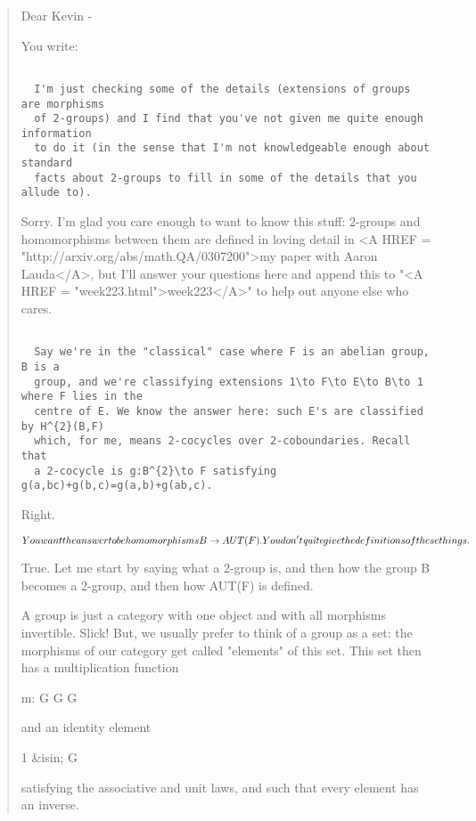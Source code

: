 \begin{quote}
Dear Kevin -

You write:


\begin{verbatim}

  I'm just checking some of the details (extensions of groups are morphisms 
  of 2-groups) and I find that you've not given me quite enough information 
  to do it (in the sense that I'm not knowledgeable enough about standard 
  facts about 2-groups to fill in some of the details that you allude to).
\end{verbatim}
    
 
Sorry.   I'm glad you care enough to want to know this stuff:
2-groups and homomorphisms between them are defined in loving detail 
in 
<A HREF = "http://arxiv.org/abs/math.QA/0307200">my 
paper with Aaron Lauda</A>, but I'll answer your questions here 
and append this to "<A HREF = "week223.html">week223</A>" 
to help out anyone else who cares.


\begin{verbatim}

  Say we're in the "classical" case where F is an abelian group, B is a
  group, and we're classifying extensions 1\to F\to E\to B\to 1 where F lies in the
  centre of E. We know the answer here: such E's are classified by H^{2}(B,F)
  which, for me, means 2-cocycles over 2-coboundaries. Recall that
  a 2-cocycle is g:B^{2}\to F satisfying g(a,bc)+g(b,c)=g(a,b)+g(ab,c).
\end{verbatim}
    
 
Right.


$$

  You want the answer to be homomorphisms B \to  AUT(F). You don't \emph{quite} give
  the definitions of these things. 
$$
    

True.  Let me start by saying what a 2-group is, and then how the group 
B becomes a 2-group, and then how AUT(F) is defined.

A group is just a category with one object and with all morphisms invertible.
Slick!  But, we usually prefer to think of a group as a set: the morphisms 
of our category get called "elements" 
of this set.  This set then has a multiplication function


m: G \times  G \to  G


and an identity element

1 &isin; G

satisfying the associative and unit laws, and such that every element
has an inverse.  


\end{quote}
